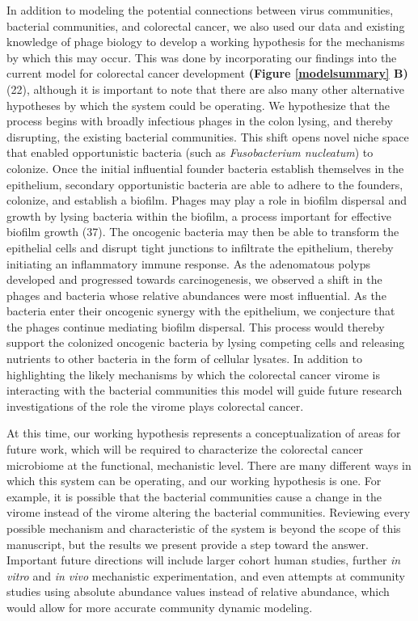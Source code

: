 \documentclass[12pt,]{article}
\begin{document}
In addition to modeling the potential connections between virus
communities, bacterial communities, and colorectal cancer, we also used
our data and existing knowledge of phage biology to develop a working
hypothesis for the mechanisms by which this may occur. This was done by
incorporating our findings into the current model for colorectal cancer
development \textbf{(Figure \ref{modelsummary} B)} (22), although it is
important to note that there are also many other alternative hypotheses
by which the system could be operating. We hypothesize that the process
begins with broadly infectious phages in the colon lysing, and thereby
disrupting, the existing bacterial communities. This shift opens novel
niche space that enabled opportunistic bacteria (such as
\emph{Fusobacterium nucleatum}) to colonize. Once the initial
influential founder bacteria establish themselves in the epithelium,
secondary opportunistic bacteria are able to adhere to the founders,
colonize, and establish a biofilm. Phages may play a role in biofilm
dispersal and growth by lysing bacteria within the biofilm, a process
important for effective biofilm growth (37). The oncogenic bacteria may
then be able to transform the epithelial cells and disrupt tight
junctions to infiltrate the epithelium, thereby initiating an
inflammatory immune response. As the adenomatous polyps developed and
progressed towards carcinogenesis, we observed a shift in the phages and
bacteria whose relative abundances were most influential. As the
bacteria enter their oncogenic synergy with the epithelium, we
conjecture that the phages continue mediating biofilm dispersal. This
process would thereby support the colonized oncogenic bacteria by lysing
competing cells and releasing nutrients to other bacteria in the form of
cellular lysates. In addition to highlighting the likely mechanisms by
which the colorectal cancer virome is interacting with the bacterial
communities this model will guide future research investigations of the
role the virome plays colorectal cancer.

At this time, our working hypothesis represents a conceptualization of
areas for future work, which will be required to characterize the
colorectal cancer microbiome at the functional, mechanistic level. There
are many different ways in which this system can be operating, and our
working hypothesis is one. For example, it is possible that the
bacterial communities cause a change in the virome instead of the virome
altering the bacterial communities. Reviewing every possible mechanism
and characteristic of the system is beyond the scope of this manuscript,
but the results we present provide a step toward the answer. Important
future directions will include larger cohort human studies, further
\emph{in vitro} and \emph{in vivo} mechanistic experimentation, and even
attempts at community studies using absolute abundance values instead of
relative abundance, which would allow for more accurate community
dynamic modeling.
\end{document}
